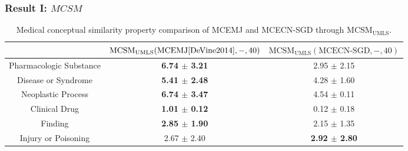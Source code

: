 \documentclass{beamer}
\newcommand\T{\rule{0pt}{2.6ex}}       %
\newcommand\B{\rule[-1.2ex]{0pt}{0pt}} %
\begin{document}
\begin{frame}
\frametitle{Result I: $MCSM$}
\begin{table}[h!]
\begin{center}
\caption{\centering \scriptsize 
Medical conceptual similarity property comparison of MCEMJ and MCECN-SGD through  
$\text{MCSM}_{\text{UMLS}}$.} 
{
\tiny
\begin{tabular}{|c|c|c|}
    \hline      
                      & 
$\text{MCSM}_{\text{UMLS}}(\text{MCEMJ\cite{DeVine2014}},-,40)$ & 
$\text{MCSM}_{\text{UMLS}}(\text{MCECN-SGD},-,40)$\\ 
    \hline
    Pharmacologic Substance & {\bf 6.74 $\pm$ 3.21}  &  2.95 $\pm$ 2.15 \T \B  \\
    \hline
    Disease or Syndrome     & {\bf 5.41 $\pm$ 2.48}  &  4.28 $\pm$ 1.60 \T \B \\
    \hline
    Neoplastic Process      & {\bf 6.74 $\pm$ 3.47}  &  4.54 $\pm$ 0.11  \T \B \\
    \hline
    Clinical Drug           & {\bf 1.01 $\pm$ 0.12}  &  0.12 $\pm$ 0.18  \T \B \\
    \hline
    Finding                 & {\bf 2.85 $\pm$ 1.90}  &  2.15 $\pm$ 1.35  \T \B \\
    \hline
    Injury or Poisoning     & 2.67 $\pm$ 2.40  &  {\bf 2.92 $\pm$ 2.80}  \T \B \\
    \hline
\end{tabular}
}
\end{center}
\label{umls_dcg}
\end{table}

\end{frame}
\end{document}
